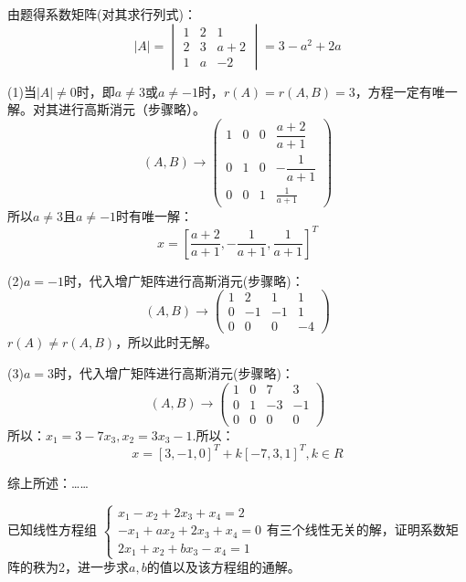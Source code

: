 \documentclass[a4paper]{report}
\begin{document}
\begin{jie}
由题得系数矩阵(对其求行列式)：
\begin{equation*}
|A|=
\begin{vmatrix}
1&2&1\\2 &3&a+2\\ 1&a &-2
\end{vmatrix}=3-a^2+2a
\end{equation*}

(1)当$|A|\neq 0$时，即$a\neq 3$或$a\neq -1$时，$r(A)=r(A,B)=3$，方程一定有唯一解。对其进行高斯消元（步骤略）。
\begin{equation*}
(A,B)\rightarrow
\begin{pmatrix}
1&0&0&\dfrac{a+2}{a+1}\\[3pt]
0&1&0&-\dfrac{1}{a+1}\\[3pt]
0&0&1&\frac{1}{a+1}
\end{pmatrix}
\end{equation*}
所以$a\neq 3$且$a\neq -1$时有唯一解：
\begin{equation*}
  x=\left[\dfrac{a+2}{a+1},-\dfrac{1}{a+1},\frac{1}{a+1}\right]^T
\end{equation*}

(2)$a=-1$时，代入增广矩阵进行高斯消元(步骤略)：
\begin{equation*}
(A,B)\rightarrow
\begin{pmatrix}
1&2&1&1\\
0&-1&-1&1\\
0&0&0&-4
\end{pmatrix}
\end{equation*}
$r(A)\neq r(A,B)$，所以此时无解。

(3)$a=3$时，代入增广矩阵进行高斯消元(步骤略)：\begin{equation*}
(A,B)\rightarrow
\begin{pmatrix}
1&0&7&3\\
0&1&-3&-1\\
0&0&0&0
\end{pmatrix}
\end{equation*}
所以：$x_1=3-7x_3,x_2=3x_3-1$.所以：
\begin{equation*}
x=[3,-1,0]^T+k[-7,3,1]^T,k\in R
\end{equation*}

综上所述：……
\end{jie}

\EX 已知线性方程组
$
\begin{cases}
x_1-x_2+2x_3+x_4=2\\
-x_1+ax_2+2x_3+x_4=0\\
2x_1+x_2+bx_3-x_4=1
\end{cases}
$有三个线性无关的解，证明系数矩阵的秩为2，进一步求$a,b$的值以及该方程组的通解。
\end{document}
